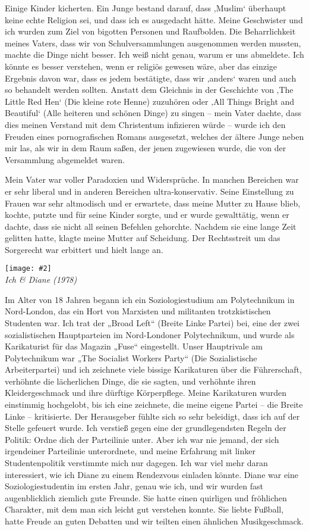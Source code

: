 \documentclass[12pt]{memoir}
\newcommand{\img}[3]{\begin{center}%
\texttt{[image: \#2]}\\{\small\em#3}%
\end{center}}
\begin{document}
Einige Kinder kicherten.
Ein Junge bestand darauf, dass ‚Muslim‘ überhaupt keine echte Religion sei,
und dass ich es ausgedacht hätte.
Meine Geschwister und ich wurden zum Ziel von bigotten Personen und Raufbolden.
Die Beharrlichkeit meines Vaters,
dass wir von Schulversammlungen ausgenommen werden mussten,
machte die Dinge nicht besser.
Ich weiß nicht genau, warum er uns abmeldete.
Ich könnte es besser verstehen, wenn er religiös gewesen wäre,
aber das einzige Ergebnis davon war, dass es jedem bestätigte,
dass wir ‚anders‘ waren und auch so behandelt werden sollten.
Anstatt dem Gleichnis in der Geschichte von ‚The Little Red Hen‘
(Die kleine rote Henne) zuzuhören oder ‚All Things Bright and Beautiful‘
(Alle heiteren und schönen Dinge) zu singen – mein Vater dachte,
dass dies meinen Verstand mit dem Christentum infizieren würde –
wurde ich den Freuden eines pornografischen Romans ausgesetzt,
welches der ältere Junge neben mir las, als wir in dem Raum saßen,
der jenen zugewiesen wurde, die von der Versammlung abgemeldet waren.

Mein Vater war voller Paradoxien und Widersprüche.
In manchen Bereichen war er sehr liberal
und in anderen Bereichen ultra-konservativ.
Seine Einstellung zu Frauen war sehr altmodisch und er erwartete,
dass meine Mutter zu Hause blieb, kochte, putzte und für seine Kinder sorgte,
und er wurde gewalttätig, wenn er dachte,
dass sie nicht all seinen Befehlen gehorchte.
Nachdem sie eine lange Zeit gelitten hatte, klagte meine Mutter auf Scheidung.
Der Rechtsstreit um das Sorgerecht war erbittert und hielt lange an.

\img{scale=0.3}{Hassan_and_Diane.jpg}
{Ich \& Diane (1978)}

Im Alter von 18 Jahren begann ich ein Soziologiestudium
am Polytechnikum in Nord-London,
das ein Hort von Marxisten und militanten trotzkistischen Studenten war.
Ich trat der „Broad Left“ (Breite Linke Partei) bei,
eine der zwei sozialistischen Hauptparteien im Nord-Londoner Polytechnikum,
und wurde als Karikaturist für das Magazin „Fuse“ eingestellt.
Unser Hauptrivale am Polytechnikum war „The Socialist Workers Party“
(Die Sozialistische Arbeiterpartei) und ich zeichnete
viele bissige Karikaturen über die Führerschaft,
verhöhnte die lächerlichen Dinge, die sie sagten,
und verhöhnte ihren Kleidergeschmack und ihre dürftige Körperpflege.
Meine Karikaturen wurden einstimmig hochgelobt, bis ich eine zeichnete,
die meine eigene Partei – die Breite Linke – kritisierte.
Der Herausgeber fühlte sich so sehr beleidigt,
dass ich auf der Stelle gefeuert wurde.
Ich verstieß gegen eine der grundlegendsten Regeln der Politik:
Ordne dich der Parteilinie unter.
Aber ich war nie jemand, der sich irgendeiner Parteilinie unterordnete,
und meine Erfahrung mit linker Studentenpolitik verstimmte mich nur dagegen.
Ich war viel mehr daran interessiert,
wie ich Diane zu einem Rendezvous einladen könnte.
Diane war eine Soziologiestudentin im ersten Jahr, genau wie ich,
und wir wurden fast augenblicklich ziemlich gute Freunde.
Sie hatte einen quirligen und fröhlichen Charakter,
mit dem man sich leicht gut verstehen konnte.
Sie liebte Fußball, hatte Freude an guten Debatten
und wir teilten einen ähnlichen Musikgeschmack.
\end{document}
